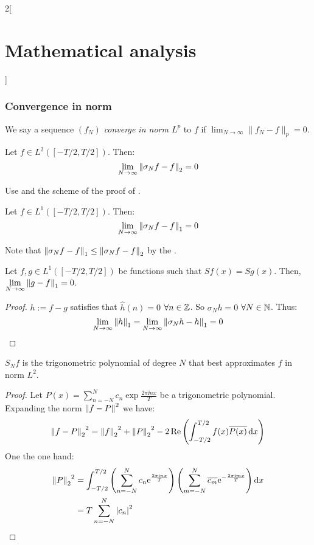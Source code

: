 \documentclass[../../../main_math.tex]{subfiles}
\begin{document}
\begin{multicols}{2}[\section{Mathematical analysis}]
  \subsubsection{Convergence in norm}
  \begin{definition}
    We say a sequence $(f_N)$ \emph{converge in norm $L^p$} to $f$ if $\displaystyle\lim_{N\to\infty}\|f_N-f\|_p=0$.
  \end{definition}
  \begin{theorem}
    Let $f\in L^2([-T/2,T/2])$. Then: $$\lim_{N\to\infty}\left\|\sigma_Nf-f\right\|_2=0$$
  \end{theorem}
  \begin{sproof}
    Use  and the scheme of the proof of .
  \end{sproof}
  \begin{corollary}
    Let $f\in L^1([-T/2,T/2])$. Then: $$\lim_{N\to\infty}\left\|\sigma_Nf-f\right\|_1=0$$
  \end{corollary}
  \begin{sproof}
    Note that $\left\|\sigma_Nf-f\right\|_1\leq\left\|\sigma_Nf-f\right\|_2$ by the .
  \end{sproof}
  \begin{corollary}
    Let $f,g\in L^1([-T/2,T/2])$ be functions such that $Sf(x)=Sg(x)$. Then, $\displaystyle\lim_{N\to\infty}\left\|g-f\right\|_1=0$.
  \end{corollary}
  \begin{proof}
    $h:=f-g$ satisfies that $\widehat{h}(n)=0$ $\forall n\in\mathbb{Z}$. So $\sigma_Nh=0$ $\forall N\in\mathbb{N}$. Thus:
    $$\lim_{N\to\infty}\left\|h\right\|_1=\lim_{N\to\infty}\left\|\sigma_Nh-h\right\|_1=0$$
  \end{proof}
  \begin{theorem}
    $S_Nf$ is the trigonometric polynomial of degree $N$ that best approximates $f$ in norm $L^2$.
  \end{theorem}
  \begin{proof}
    Let $P(x)=\sum_{n=-N}^{N}c_n\exp{\frac{2\pi\ii nx}{T}}$ be a trigonometric polynomial. Expanding the norm $\left\|f-P\right\|^2$ we have:
    $${\left\|f-P\right\|_2}^2={\left\|f\right\|_2}^2+{\left\|P\right\|_2}^2-2\Re\left(\int_{-T/2}^{T/2}f(x)\overline{P(x)}\dd{x}\right)$$
    One the one hand:
    \begin{align*}
      {\norm{P}_2}^2 & =\int_{-T/2}^{T/2}\left(\sum_{n=-N}^{N}c_n\exp{\frac{2\pi\ii nx}{T}}\right)\left(\sum_{m=-N}^{N}\overline{c_m}\exp{-\frac{2\pi\ii mx}{T}}\right)\dd{x} \\
                     & =T\sum_{n=-N}^{N}\abs{c_n}^2

\end{align*}
\end{proof}
\end{multicols}
\end{document}
